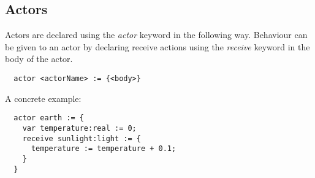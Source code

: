 \subsection{Actors}
\label{sub:actors}

Actors are declared using the \emph{actor} keyword in the following way. Behaviour can be given to an actor by declaring receive actions using the \emph{receive} keyword in the body of the actor.

\begin{verbatim}
  actor <actorName> := {<body>}
\end{verbatim}

A concrete example:

\begin{verbatim}
  actor earth := {
    var temperature:real := 0;
    receive sunlight:light := {
      temperature := temperature + 0.1;
    }
  }
\end{verbatim}

